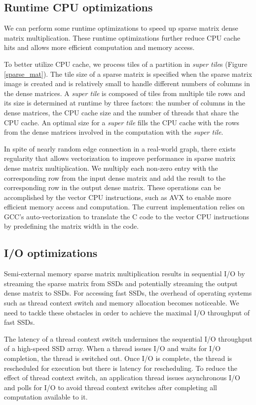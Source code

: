 \subsection{Runtime CPU optimizations} \label{sec:cpu}
We can perform some runtime optimizations to speed up sparse matrix
dense matrix multiplication. These runtime optimizations further reduce
CPU cache hits and allows more efficient computation and memory access.

To better utilize CPU cache, we process tiles of a partition in
\textit{super tile}s (Figure \ref{sparse_mat}). The tile size of a sparse
matrix is specified when the sparse matrix image is created and is relatively
small to handle different numbers of columns in the dense matrices.
A \textit{super tile} is composed of tiles from multiple tile rows and its
size is determined at runtime by three factors: the number of columns
in the dense matrices, the CPU cache size and the number of threads that
share the CPU cache. An optimal size for a \textit{super tile} fills
the CPU cache with the rows from the dense matrices involved in
the computation with the \textit{super tile}.

In spite of nearly random edge connection in a real-world graph,
there exists regularity  that allows vectorization to improve performance
in sparse matrix dense matrix multiplication. We multiply each non-zero entry
with the corresponding row from the input dense matrix
and add the result to the corresponding row in the output dense matrix.
These operations can be accomplished by the vector CPU instructions, such as
AVX \cite{avx} to enable more efficient memory access and computation.
The current implementation relies on GCC's auto-vectorization
to translate the C code to the vector CPU instructions by predefining the matrix
width in the code.

\subsection{I/O optimizations}
Semi-external memory sparse matrix multiplication results in sequential I/O
by streaming the sparse matrix from SSDs and potentially streaming the output
dense matrix to SSDs. For accessing fast SSDs, the overhead of operating systems
such as thread context switch and memory allocation becomes noticeable.
We need to tackle these obstacles in order to achieve the maximal I/O
throughput of fast SSDs.

The latency of a thread context switch undermines the sequential I/O throughput
of a high-speed SSD array.
When a thread issues I/O and waits for I/O completion, the thread is switched
out. Once I/O is complete, the thread is rescheduled for execution but there is
latency for rescheduling. To reduce the effect of thread context switch,
an application thread issues asynchronous I/O and polls for I/O to avoid thread
context switches after completing all computation available to it.

